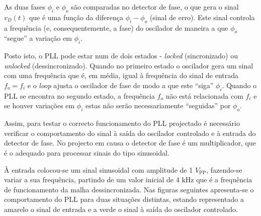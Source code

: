 \documentclass[11pt]{article}
\numberwithin{equation}{section}
\begin{document}
As duas fases $\phi_{i}$ e $\phi_{o}$ são comparadas no detector de fase, o que gera o sinal $v_{D}\left(t\right)$ que é uma função da diferença $\phi_{i} - \phi_{o}$ (sinal de erro). Este sinal controla a frequência (e, consequentemente, a fase) do oscilador de maneira a que $\phi_{o}$ ``segue'' a variação em $\phi_{i}$.

Posto isto, o PLL pode estar num de dois estados - \textit{locked} (sincronizado) ou \textit{unlocked} (dessincronizado). Quando no primeiro estado o oscilador gera um sinal com uma frequência que é, em média, igual à frequência do sinal de entrada $f_o = f_i$ e o \textit{loop} ajusta o oscilador de fase de modo a que este ``siga'' $\phi_{i}$. Quando o PLL se encontra no segundo estado, a frequência $f_o$ não está relacionada com $f_i$ e se houver variações em $\phi_{i}$ estas não serão necessariamente ``seguidas'' por $\phi_{o}$.

Assim, para testar o correcto funcionamento do PLL projectado é necessário verificar o comportamento do sinal à saída do oscilador controlado e à entrada do detector de fase. No projecto em causa o detector de fase é um multiplicador, que é o adequado para processar sinais do tipo sinusoidal. 

À entrada colocou-se um sinal sinusoidal com amplitude de 1 $V_{\text{PP}}$, fazendo-se variar a sua frequência, partindo de um valor inicial de 4 kHz que é a frequência de funcionamento da malha dessincronizada. Nas figuras seguintes apresenta-se o comportamento do PLL para duas situações distintas, estando representado a amarelo o sinal de entrada e a verde o sinal à saída do oscilador controlado.
\end{document}
